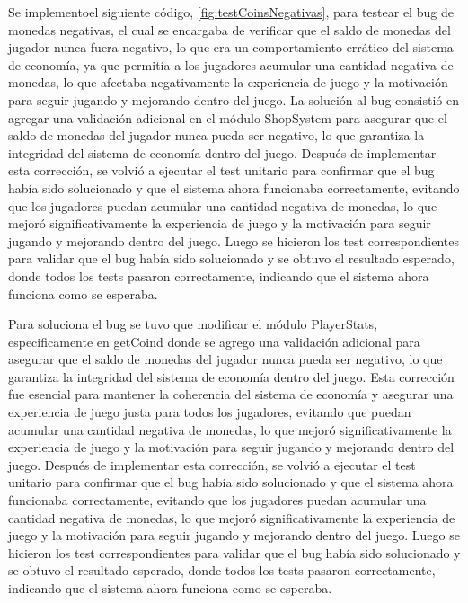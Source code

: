 Se implementoel siguiente código, \cref{fig:testCoinsNegativas}, para testear el bug de monedas negativas, el cual se encargaba de verificar que el saldo de monedas del jugador nunca fuera negativo, lo que era un comportamiento errático del sistema de economía, ya que permitía a los jugadores acumular una cantidad negativa de monedas, lo que afectaba negativamente la experiencia de juego y la motivación para seguir jugando y mejorando dentro del juego. La solución al bug consistió en agregar una validación adicional en el módulo ShopSystem para asegurar que el saldo de monedas del jugador nunca pueda ser negativo, lo que garantiza la integridad del sistema de economía dentro del juego. Después de implementar esta corrección, se volvió a ejecutar el test unitario para confirmar que el bug había sido solucionado y que el sistema ahora funcionaba correctamente, evitando que los jugadores puedan acumular una cantidad negativa de monedas, lo que mejoró significativamente la experiencia de juego y la motivación para seguir jugando y mejorando dentro del juego. Luego se hicieron los test correspondientes para validar que el bug había sido solucionado y se obtuvo el resultado esperado, donde todos los tests pasaron correctamente, indicando que el sistema ahora funciona como se esperaba.

Para soluciona el bug se tuvo que modificar el módulo PlayerStats, especificamente en getCoind donde se agrego una validación adicional para asegurar que el saldo de monedas del jugador nunca pueda ser negativo, lo que garantiza la integridad del sistema de economía dentro del juego. Esta corrección fue esencial para mantener la coherencia del sistema de economía y asegurar una experiencia de juego justa para todos los jugadores, evitando que puedan acumular una cantidad negativa de monedas, lo que mejoró significativamente la experiencia de juego y la motivación para seguir jugando y mejorando dentro del juego. Después de implementar esta corrección, se volvió a ejecutar el test unitario para confirmar que el bug había sido solucionado y que el sistema ahora funcionaba correctamente, evitando que los jugadores puedan acumular una cantidad negativa de monedas, lo que mejoró significativamente la experiencia de juego y la motivación para seguir jugando y mejorando dentro del juego. Luego se hicieron los test correspondientes para validar que el bug había sido solucionado y se obtuvo el resultado esperado, donde todos los tests pasaron correctamente, indicando que el sistema ahora funciona como se esperaba.


